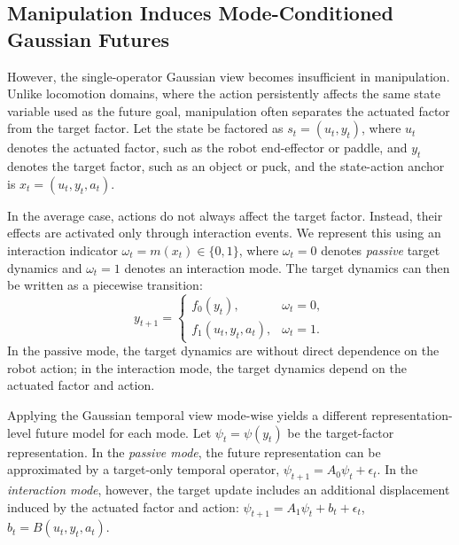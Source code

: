 \subsection{Manipulation Induces Mode-Conditioned Gaussian Futures}
\label{subsec:mode-conditioned-gaussian}
However, the single-operator Gaussian view becomes insufficient in manipulation. Unlike locomotion domains, where the action persistently affects the same state variable used as the future goal, manipulation often separates the actuated factor from the target factor. Let the state be factored as $s_t=(u_t,y_t)$,
where $u_t$ denotes the actuated factor, such as the robot end-effector or paddle, and $y_t$ denotes the target factor, such as an object or puck, and the state-action anchor is $x_t=(u_t,y_t,a_t)$.

In the average case, actions do not always affect the target factor. Instead, their effects are activated only through interaction events. We represent this using an interaction indicator $\omega_t=m(x_t)\in\{0,1\}$,
where $\omega_t=0$ denotes \textit{passive} target dynamics and $\omega_t=1$ denotes an interaction mode. The target dynamics can then be written as a piecewise transition:
\begin{equation}
y_{t+1}
=
\begin{cases}
f_0(y_t), & \omega_t=0,\\
f_1(u_t,y_t,a_t), & \omega_t=1.
\end{cases}
\label{eq:piecewise-target-dynamics}
\end{equation}
In the passive mode, the target dynamics are without direct dependence on the robot action; in the interaction mode, the target dynamics depend on the actuated factor and action.

Applying the Gaussian temporal view mode-wise yields a different representation-level future model for each mode. Let \(\psi_t=\psi(y_t)\) be the target-factor representation. In the \textit{passive mode}, the future representation can be approximated by a target-only temporal operator, $\psi_{t+1}=A_0\psi_t+\epsilon_t$.
In the \textit{interaction mode}, however, the target update includes an additional displacement induced by the actuated factor and action:
    $\psi_{t+1}
    =
    A_1\psi_t + b_t + \epsilon_t$,
    $b_t = B(u_t,y_t,a_t)$.


